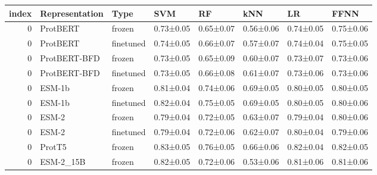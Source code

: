 \begin{tabular}{rlllllll}
\toprule
 index & Representation &      Type &       SVM &        RF &       kNN &        LR &      FFNN \\
\midrule
     0 &       ProtBERT &    frozen & 0.73±0.05 & 0.65±0.07 & 0.56±0.06 & 0.74±0.05 & 0.75±0.06 \\
     0 &       ProtBERT & finetuned & 0.74±0.05 & 0.66±0.07 & 0.57±0.07 & 0.74±0.04 & 0.75±0.05 \\
     0 &   ProtBERT-BFD &    frozen & 0.73±0.05 & 0.65±0.09 & 0.60±0.07 & 0.73±0.07 & 0.73±0.06 \\
     0 &   ProtBERT-BFD & finetuned & 0.73±0.05 & 0.66±0.08 & 0.61±0.07 & 0.73±0.06 & 0.73±0.06 \\
     0 &         ESM-1b &    frozen & 0.81±0.04 & 0.74±0.06 & 0.69±0.05 & 0.80±0.05 & 0.80±0.05 \\
     0 &         ESM-1b & finetuned & 0.82±0.04 & 0.75±0.05 & 0.69±0.05 & 0.80±0.05 & 0.80±0.06 \\
     0 &          ESM-2 &    frozen & 0.79±0.04 & 0.72±0.05 & 0.63±0.07 & 0.79±0.04 & 0.80±0.06 \\
     0 &          ESM-2 & finetuned & 0.79±0.04 & 0.72±0.06 & 0.62±0.07 & 0.80±0.04 & 0.79±0.06 \\
     0 &         ProtT5 &    frozen & 0.83±0.05 & 0.76±0.05 & 0.66±0.06 & 0.82±0.04 & 0.82±0.05 \\
     0 &      ESM-2_15B &    frozen & 0.82±0.05 & 0.72±0.06 & 0.53±0.06 & 0.81±0.06 & 0.81±0.06 \\
\bottomrule
\end{tabular}
